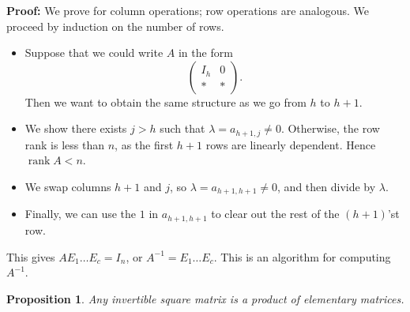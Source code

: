\documentclass[12pt]{article}
\DeclareMathOperator{\rank}{rank}
\newtheorem{proposition}{Proposition}[section]
\theoremstyle{definition}
\theoremstyle{remark}
\begin{document}
\begin{adjustbox}{minipage = \columnwidth - 25.5pt, margin=1em, frame=1pt, margin=0em}
\textbf{Proof:} We prove for column operations; row operations are analogous. We proceed by induction on the number of rows.
\begin{itemize}
	\item Suppose that we could write $A$ in the form
		\[
		\begin{pmatrix}
			I_h & 0 \\
			\ast & \ast
		\end{pmatrix}
		.\]
		Then we want to obtain the same structure as we go from $h$ to $h + 1$.
	\item We show there exists $j > h$ such that $\lambda = a_{h+1, j} \neq 0$. Otherwise, the row rank is less than $n$, as the first $h+1$ rows are linearly dependent. Hence $\rank A < n$.
	\item We swap columns $h + 1$ and $j$, so $\lambda = a_{h+1,h+1} \neq 0$, and then divide by $\lambda$.
	\item Finally, we can use the $1$ in $a_{h+1, h+1}$ to clear out the rest of the $(h+1)$'st row.
\end{itemize}

\end{adjustbox}

This gives $A E_1 \ldots E_c = I_n$, or $A^{-1} = E_1 \ldots E_c$. This is an algorithm for computing $A^{-1}$.

\begin{proposition}
	Any invertible square matrix is a product of elementary matrices.
\end{proposition}



\newpage

\printindex
\end{document}
